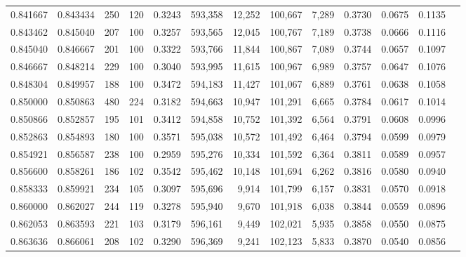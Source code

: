 \begin{tabular}{rrrrrrrrrrrrr}
0.841667 & 0.843434 &    250 &   120 &                                     0.3243 & 593,358 &  12,252 & 100,667 &   7,289 & 0.3730 & 0.0675 & 0.1135 \\
0.843462 & 0.845040 &    207 &   100 &                                     0.3257 & 593,565 &  12,045 & 100,767 &   7,189 & 0.3738 & 0.0666 & 0.1116 \\
0.845040 & 0.846667 &    201 &   100 &                                     0.3322 & 593,766 &  11,844 & 100,867 &   7,089 & 0.3744 & 0.0657 & 0.1097 \\
0.846667 & 0.848214 &    229 &   100 &                                     0.3040 & 593,995 &  11,615 & 100,967 &   6,989 & 0.3757 & 0.0647 & 0.1076 \\
0.848304 & 0.849957 &    188 &   100 &                                     0.3472 & 594,183 &  11,427 & 101,067 &   6,889 & 0.3761 & 0.0638 & 0.1058 \\
0.850000 & 0.850863 &    480 &   224 &                                     0.3182 & 594,663 &  10,947 & 101,291 &   6,665 & 0.3784 & 0.0617 & 0.1014 \\
0.850866 & 0.852857 &    195 &   101 &                                     0.3412 & 594,858 &  10,752 & 101,392 &   6,564 & 0.3791 & 0.0608 & 0.0996 \\
0.852863 & 0.854893 &    180 &   100 &                                     0.3571 & 595,038 &  10,572 & 101,492 &   6,464 & 0.3794 & 0.0599 & 0.0979 \\
0.854921 & 0.856587 &    238 &   100 &                                     0.2959 & 595,276 &  10,334 & 101,592 &   6,364 & 0.3811 & 0.0589 & 0.0957 \\
0.856600 & 0.858261 &    186 &   102 &                                     0.3542 & 595,462 &  10,148 & 101,694 &   6,262 & 0.3816 & 0.0580 & 0.0940 \\
0.858333 & 0.859921 &    234 &   105 &                                     0.3097 & 595,696 &   9,914 & 101,799 &   6,157 & 0.3831 & 0.0570 & 0.0918 \\
0.860000 & 0.862027 &    244 &   119 &                                     0.3278 & 595,940 &   9,670 & 101,918 &   6,038 & 0.3844 & 0.0559 & 0.0896 \\
0.862053 & 0.863593 &    221 &   103 &                                     0.3179 & 596,161 &   9,449 & 102,021 &   5,935 & 0.3858 & 0.0550 & 0.0875 \\
0.863636 & 0.866061 &    208 &   102 &                                     0.3290 & 596,369 &   9,241 & 102,123 &   5,833 & 0.3870 & 0.0540 & 0.0856 \\

\end{tabular}
